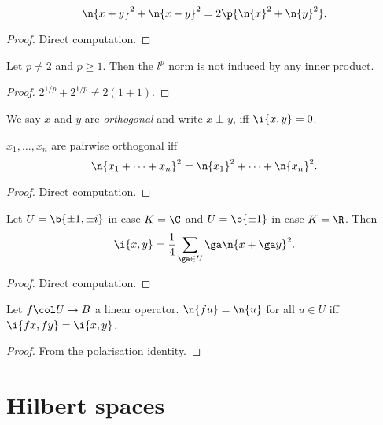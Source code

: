 \begin{lemma}
  $$ \n{x+y}^2 + \n{x-y}^2 = 2\p{\n{x}^2 + \n{y}^2}. $$
\end{lemma}

\begin{proof}
  Direct computation.
\end{proof}

\begin{lemma}
  Let $p \ne 2$ and $p \ge 1$.
  Then the $l^p$ norm is not induced by any inner product.
\end{lemma}

\begin{proof}
  $2^{1/p} + 2^{1/p} \ne 2 (1 + 1). $
\end{proof}

\begin{definition}
  We say $x$ and $y$ are \emph{orthogonal} and write $x \perp y$, iff $\i{x, y} = 0$.
\end{definition}

\begin{lemma}[Pythagoras]
  $x_1, \dots, x_n$ are pairwise orthogonal iff
  $$ \n{x_1+ \dots + x_n}^2 = \n{x_1}^2 + \dots + \n{x_n}^2. $$
\end{lemma}

\begin{proof}
  Direct computation.
\end{proof}

\begin{lemma}
  Let $U = \b{ \pm 1, \pm i}$ in case $K= \C$ and $U = \b{ \pm 1}$ in case $K = \R$. Then
  $$ \i{x, y} = \frac{1}{4} \sum_{\ga \in U} \ga \n{x + \ga y}^2. $$
\end{lemma}

\begin{proof}
  Direct computation.
\end{proof}

\begin{lemma}
  Let $f \col U \to B$ a linear operator.
  $\n{fu} = \n{u}$ for all $u \in U$ iff
  $\i{fx, fy} = \i{x, y}$.
\end{lemma}

\begin{proof}
  From the polarisation identity.
\end{proof}

\section{Hilbert spaces}


